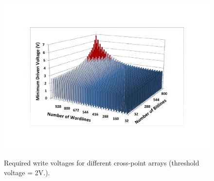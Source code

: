 \begin{figure}%
\centering
\hspace{-5pt}
  \includegraphics[width=2.6 in]{./figures/worst_v_f1.pdf}\\
  \caption{Required write voltages for different cross-point arrays (threshold voltage = 2V.). }\label{fig:worst_v}
  \vspace{-5pt}
\end{figure}

%







